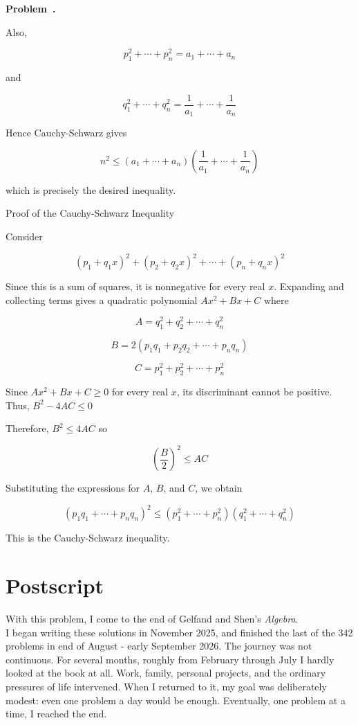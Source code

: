 \documentclass[10pt]{article}
\newcounter{problem}
\newenvironment{problem}[1][]{
  \refstepcounter{problem}
  \par\noindent\textbf{Problem~\theproblem. #1}\par
  \vspace{0.5em}
}{\vspace{1em}}
\begin{document}
\begin{problem}
Also,

\[
p_1^2 + \cdots + p_n^2 = a_1 + \cdots + a_n
\]

and

\[
q_1^2+ \cdots + q_n^2 = \dfrac{1}{a_1} + \cdots + \dfrac{1}{a_n}
\]

Hence Cauchy-Schwarz gives

\[
n^2 \le (a_1 + \cdots + a_n) \left(\dfrac{1}{a_1} + \cdots + \dfrac{1}{a_n}\right)
\]


which is precisely the desired inequality.


Proof of the Cauchy-Schwarz Inequality

Consider

\[
(p_1 + q_1x)^2 + (p_2 + q_2x)^2 + \cdots + (p_n + q_nx)^2
\]

Since this is a sum of squares, it is nonnegative for every real $x$. Expanding and collecting terms gives a quadratic polynomial $Ax^2 + Bx + C$ where

\[
A = q_1^2 + q_2^2 + \cdots + q_n^2
\]

\[
B = 2(p_1 q_1 + p_2 q_2 + \cdots +p_n q_n)
\]

\[
C = p_1^2 + p_2^2 + \cdots + p_n^2
\]


Since $Ax^2 + Bx + C\ge 0$ for every real $x$, its discriminant cannot be positive. Thus, $B^2 - 4AC \le 0$

Therefore, $B^2 \le 4AC$ so

\[
\left(\dfrac{B}{2}\right)^2 \le AC
\]


Substituting the expressions for $A$, $B$, and $C$, we obtain

\[
(p_1 q_1 + \cdots +p_n q_n)^2 \le (p_1^2 + \cdots + p_n^2) (q_1^2 + \cdots + q_n^2)
\]

This is the Cauchy-Schwarz inequality.
\end{problem}

\clearpage
\thispagestyle{plain}

\section*{Postscript}

With this problem, I come to the end of Gelfand and Shen's \emph{Algebra}.\\

I began writing these solutions in November 2025, and finished the last of the 342 problems in end of August - early September 2026. The journey was not continuous. For several months, roughly from February through July I hardly looked at the book at all. Work, family, personal projects, and the ordinary pressures of life intervened. When I returned to it, my goal was deliberately modest: even one problem a day would be enough. Eventually, one problem at a time, I reached the end.\\
\end{document}
